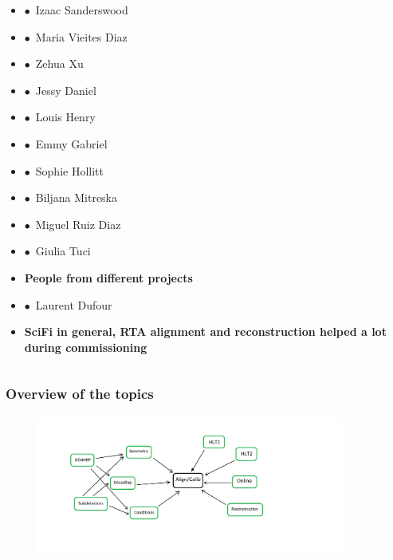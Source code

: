 \documentclass[aspectratio=1610, 12pt, xcolor=dvipsnames]{beamer}
\begin{document}
\begin{frame}
\begin{columns}
\begin{column}[c]{0.33\textwidth}
\begin{itemize}
        \item $\bullet$\, Izaac Sanderswood
        \item $\bullet$\, Maria Vieites Diaz
        \item $\bullet$\, Zehua Xu
        \item $\bullet$\, Jessy Daniel
        \item $\bullet$\, Louis Henry
        \item $\bullet$\, Emmy Gabriel
        \item $\bullet$\, Sophie Hollitt
        \item $\bullet$\, Biljana Mitreska
        \item $\bullet$\, Miguel Ruiz Diaz
        \item $\bullet$\, Giulia Tuci
        \item \textbf{People from different projects}
        \item $\bullet$\, Laurent Dufour
        \item \textbf{SciFi in general, RTA alignment and reconstruction helped a lot during commissioning}
      \end{itemize}
    \end{column}
  \end{columns}
\end{frame}

\begin{frame}\frametitle{Overview of the topics}
\begin{figure}
  \includegraphics[width=0.9\textwidth]{plots/align_reco_overview.png}
\end{figure}
\end{frame}
\end{document}
